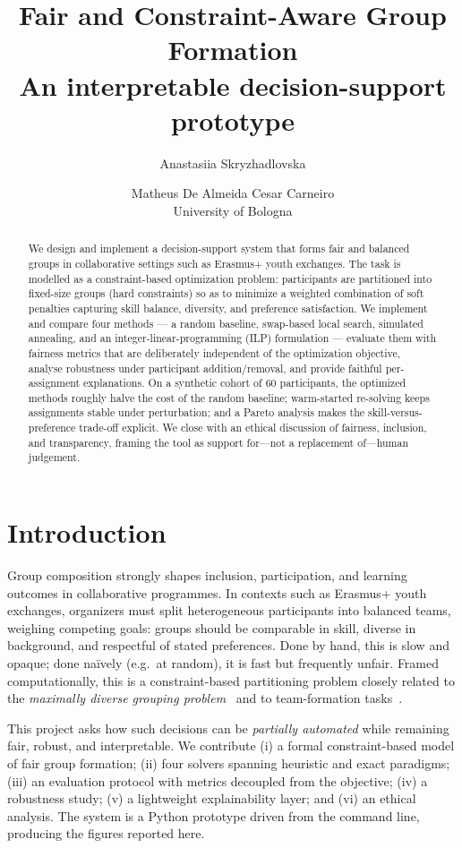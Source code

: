 \documentclass[11pt]{article}
\title{\textbf{Fair and Constraint-Aware Group Formation}\\[0.3em]
\large An interpretable decision-support prototype}
\author{Anastasiia Skryzhadlovska \and Matheus De Almeida Cesar Carneiro\\[0.2em]
\small University of Bologna}
\date{}
\begin{document}
\maketitle

\begin{abstract}
We design and implement a decision-support system that forms fair and balanced groups in
collaborative settings such as Erasmus+ youth exchanges. The task is modelled as a
constraint-based optimization problem: participants are partitioned into fixed-size groups
(hard constraints) so as to minimize a weighted combination of soft penalties capturing
skill balance, diversity, and preference satisfaction. We implement and compare four
methods --- a random baseline, swap-based local search, simulated annealing, and an
integer-linear-programming (ILP) formulation --- evaluate them with fairness metrics that
are deliberately independent of the optimization objective, analyse robustness under
participant addition/removal, and provide faithful per-assignment explanations. On a
synthetic cohort of $60$ participants, the optimized methods roughly halve the cost of the
random baseline; warm-started re-solving keeps assignments stable under perturbation; and a
Pareto analysis makes the skill-versus-preference trade-off explicit. We close with an
ethical discussion of fairness, inclusion, and transparency, framing the tool as support
for---not a replacement of---human judgement.
\end{abstract}

\section{Introduction}
Group composition strongly shapes inclusion, participation, and learning outcomes in
collaborative programmes. In contexts such as Erasmus+ youth exchanges, organizers must
split heterogeneous participants into balanced teams, weighing competing goals: groups
should be comparable in skill, diverse in background, and respectful of stated preferences.
Done by hand, this is slow and opaque; done na\"ively (e.g.\ at random), it is fast but
frequently unfair. Framed computationally, this is a constraint-based partitioning problem
closely related to the \emph{maximally diverse grouping problem}~\cite{mdgp} and to
team-formation tasks~\cite{teamexperts}.

This project asks how such decisions can be \emph{partially automated} while remaining
fair, robust, and interpretable. We contribute (i) a formal constraint-based model of fair
group formation; (ii) four solvers spanning heuristic and exact paradigms; (iii) an
evaluation protocol with metrics decoupled from the objective; (iv) a robustness study;
(v) a lightweight explainability layer; and (vi) an ethical analysis. The system is a
Python prototype driven from the command line, producing the figures reported here.
\end{document}
